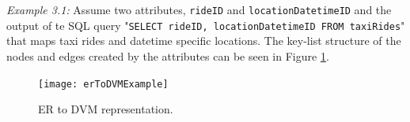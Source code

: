 \textit{Example 3.1:} Assume two attributes, \texttt{rideID} and \texttt{locationDatetimeID} and the output of te SQL query "\texttt{SELECT rideID, locationDatetimeID FROM taxiRides}" that maps taxi rides and datetime specific locations. The key-list structure of the nodes and edges created by the attributes can be seen in Figure \ref{dvm1}.

\begin{center}
    \begin{figure}[h]
        \texttt{[image: erToDVMExample]}
        \caption{ER to DVM representation.}
        \label{dvm1}
    \end{figure}
\end{center}
